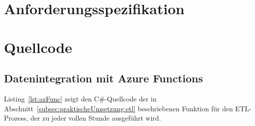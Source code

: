 \chapter{Anforderungsspezifikation} \label{ch:anforderungsspezifikation}



\chapter{Quellcode} \label{ch:quellcode}
\section{Datenintegration mit Azure Functions}
Listing~\ref{lst:azFunc} zeigt den  C\#-Quellcode der in Abschnitt~\ref{subsec:praktischeUmsetzung:etl} beschriebenen Funktion für den ETL-Prozess, der zu jeder vollen Stunde ausgeführt wird.

